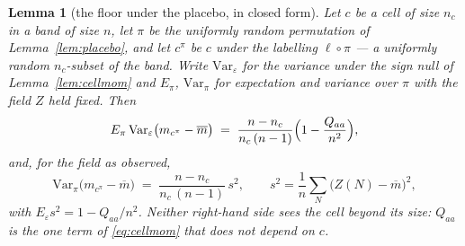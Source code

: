\documentclass[11pt,a4paper]{article}
\theoremstyle{plain}
\newtheorem{lemma}[theorem]{Lemma}
\theoremstyle{definition}
\theoremstyle{remark}
\begin{document}
\begin{lemma}[the floor under the placebo, in closed form]%
\label{lem:permfloor}
Let $c$ be a cell of size $n_c$ in a band of size $n$, let $\pi$ be the
uniformly random permutation of Lemma~\ref{lem:placebo}, and let
$c^\pi$ be $c$ under the labelling $\ell\circ\pi$ --- a uniformly
random $n_c$-subset of the band. Write $\mathrm{Var}_\varepsilon$ for
the variance under the sign null of Lemma~\ref{lem:cellmom} and
$E_\pi$, $\mathrm{Var}_\pi$ for expectation and variance over $\pi$
with the field $Z$ held fixed. Then
\begin{equation}\label{eq:permfloor}
  E_\pi\,\mathrm{Var}_\varepsilon\bigl(m_{c^\pi}-\overline m\bigr)
  \;=\;\frac{n-n_c}{n_c\,(n-1)}\Bigl(1-\frac{Q_{aa}}{n^2}\Bigr),
\end{equation}
and, for the field as observed,
\begin{equation}\label{eq:permnum}
  \mathrm{Var}_\pi\bigl(m_{c^\pi}-\overline m\bigr)
  \;=\;\frac{n-n_c}{n_c\,(n-1)}\,s^2,
  \qquad
  s^2=\frac1n\sum_N\bigl(Z(N)-\overline m\bigr)^2,
\end{equation}
with $E_\varepsilon s^2=1-Q_{aa}/n^2$. Neither right-hand side sees
the cell beyond its size: $Q_{aa}$ is the one term of
\eqref{eq:cellmom} that does not depend on $c$.
\end{lemma}
\end{document}
